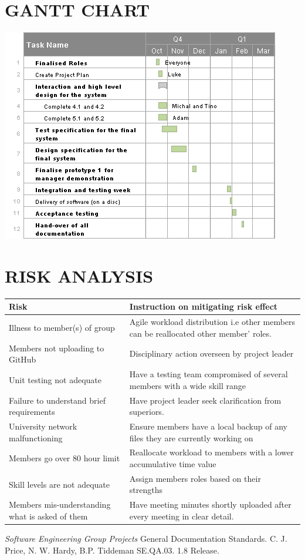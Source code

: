\documentclass{project}
\begin{document}
\section{GANTT CHART}
\includegraphics{Ganttchart}
\newpage
\section{RISK ANALYSIS}
\begin{tabular}{ | l || p{8cm} |  }
  \hline
  \textbf{Risk} & \textbf{Instruction on mitigating risk effect} \\ \hline
  Illness to member(s) of group & Agile workload distribution i.e other members can be reallocated other member' roles.\\ \hline
  Members not uploading to GitHub & Disciplinary action overseen by project leader \\ \hline
  Unit testing not adequate & Have a testing team compromised of several members with a wide skill range \\ \hline
  Failure to understand brief requirements & Have project leader seek clarification from superiors. \\ \hline
  University network malfunctioning & Ensure members have a local backup of any files they are currently working on \\ \hline
  Members go over 80 hour limit & Reallocate workload to members with a lower accumulative time value \\ \hline
  Skill levels are not adequate & Assign members roles based on their strengths \\ \hline
  Members mis-understanding what is asked of them & Have meeting minutes shortly uploaded after every meeting in clear detail. \\
  \hline
\end{tabular}  
\begin{thebibliography}{5}
 \emph{Software Engineering Group Projects}
General Documentation Standards.
C. J. Price, N. W. Hardy, B.P. Tiddeman SE.QA.03. 1.8 Release.
\end{thebibliography}
\end{document}
